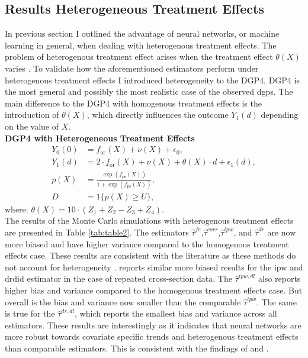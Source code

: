 \subsection{Results Heterogeneous Treatment Effects}
In previous section I outlined the advantage of neural networks, or machine learning in general, when dealing with heterogenous treatment effects.
The problem of heterogenous treatment effect arises when the treatment effect $\theta(X)$ varies \citep{hansen2022econometrics}.
To validate how the aforementioned estimators perform under heterogenous treatment effects I introduced heterogeneity to the DGP4.
DGP4 is the most general and possibly the most realistic case of the observed \ac{dgp}s.
The main difference to the DGP4 with homogenous treatment effects is the introduction of $\theta(X)$, which directly influences the outcome $Y_1(d)$ depending on the value of $X$.
\\
\textbf{DGP4 with Heterogeneous Treatment Effects}
\begin{align*}
    Y_0(0) &= f_{\text{or}}(X) + \nu(X) + \epsilon_0, \\
    Y_1(d) &= 2 \cdot f_{\text{or}}(X) + \nu(X) + \theta(X) \cdot d + \epsilon_1(d), \\
    p(X) &= \frac{\exp \left( f_{\text{ps}}(X) \right)}{1 + \exp \left( f_{\text{ps}}(X) \right)}, \\
    D &= 1\{ p(X) \geq U \},
\end{align*}
where: $\theta(X) = 10 \cdot (Z_1 + Z_2 - Z_3 + Z_4)$.\\

The results of the Monte Carlo simulations with heterogenous treatment effects are presented in Table \ref{tab:table2}.
The estimators $\hat{\tau}^{fe}$,$\hat{\tau}^{corr}$,$\hat{\tau}^{ipw}$, and $\hat{\tau}^{dr}$ are now more biased and have higher variance compared to the homogenous treatment effects case.
These results are consistent with the literature as these methods do not account for heterogeneity \citep{hansen2022econometrics}.
\citet{manfeDifferenceInDifferenceDesignRepeated} reports similar more biased results for the \ac{ipw} and \ac{drdid} estimator in the case of repeated cross-section data.
The $\hat{\tau}^{ipw,dl}$ also reports higher bias and variance compared to the homogenous treatment effects case.
But overall is the bias and variance now smaller than the comparable $\hat{\tau}^{ipw}$.
The same is true for the $\hat{\tau}^{dr,dl}$, which reports the smallest bias and variance across all estimators.
These results are interestingly as it indicates that neural networks are more robust towards covariate specific trends and heterogenous treatment effects than comparable estimators.
This is consistent with the findings of \citet{farrellDeepNeuralNetworks2021} and \citet{chernozhukovDoubleDebiasedMachine2018}.

